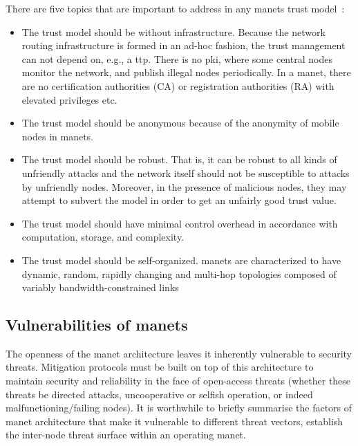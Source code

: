 There are five topics that are important to address in any \glspl{manet} trust model~\cite{Kamvar2003}:
%
\begin{itemize}
  \item The trust model should be without infrastructure.
    Because the network routing infrastructure is formed in an ad-hoc fashion, the trust management can not depend on, e.g., a \acrfull{ttp}.
    There is no \gls{pki}, where some central nodes monitor the network, and publish illegal nodes periodically.
    In a \gls{manet}, there are no certification authorities (CA) or registration authorities (RA) with elevated privileges etc.
  \item The trust model should be anonymous because of the anonymity of mobile nodes in \glspl{manet}. %
  \item The trust model should be robust.
    That is, it can be robust to all kinds of unfriendly attacks and the network itself should not be susceptible to attacks by unfriendly nodes.
    Moreover, in the presence of malicious nodes, they may attempt to subvert the model in order to get an unfairly good trust value.
  \item The trust model should have minimal control overhead in accordance with computation, storage, and complexity.
  \item The trust model should be self-organized.
    \glspl{manet} are characterized to have dynamic, random, rapidly changing and multi-hop topologies composed of variably bandwidth-constrained links
\end{itemize}
%

\subsection{Vulnerabilities of \glspl{manet}}\label{sec:manet_vuln}

The openness of the \gls{manet} architecture leaves it inherently vulnerable to security threats. 
Mitigation protocols must be built on top of this architecture to maintain security and reliability in the face of open-access threats (whether these threats be directed attacks, uncooperative or selfish operation, or indeed malfunctioning/failing nodes).
It is worthwhile to briefly summarise the factors of \gls{manet} architecture that make it vulnerable to different threat vectors, establish the inter-node threat surface within an operating \gls{manet}.

